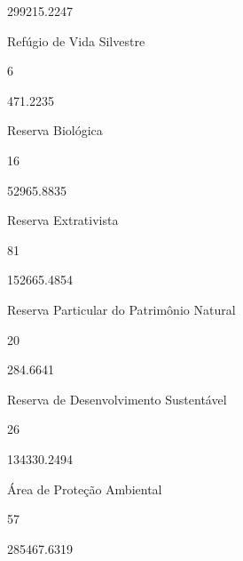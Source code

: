 \documentclass[
  letterpaper,
]{report}
\begin{document}
299215.2247

\n    

\n    

\n      

Refúgio de Vida Silvestre

\n      

6

\n      

471.2235

\n    

\n    

\n      

Reserva Biológica

\n      

16

\n      

52965.8835

\n    

\n    

\n      

Reserva Extrativista

\n      

81

\n      

152665.4854

\n    

\n    

\n      

Reserva Particular do Patrimônio Natural

\n      

20

\n      

284.6641

\n    

\n    

\n      

Reserva de Desenvolvimento Sustentável

\n      

26

\n      

134330.2494

\n    

\n    

\n      

Área de Proteção Ambiental

\n      

57

\n      

285467.6319

\n    

\n    
\end{document}
